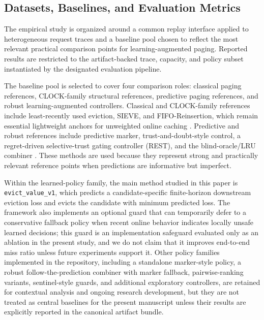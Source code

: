 \documentclass[preprint,12pt]{elsarticle}
\begin{document}
\subsection{Datasets, Baselines, and Evaluation Metrics}
\label{subsec:datasets-baselines-metrics}

The empirical study is organized around a common replay interface applied to heterogeneous request traces and a baseline pool chosen to reflect the most relevant practical comparison points for learning-augmented paging. Reported results are restricted to the artifact-backed trace, capacity, and policy subset instantiated by the designated evaluation pipeline.

The baseline pool is selected to cover four comparison roles: classical paging references, CLOCK-family structural references, predictive paging references, and robust learning-augmented controllers. Classical and CLOCK-family references include least-recently used eviction, SIEVE, and FIFO-Reinsertion, which remain essential lightweight anchors for unweighted online caching \cite{belady1966replacement_algorithms,fiat1991competitive_paging,zhang2024sieve}. Predictive and robust references include predictive marker, trust-and-doubt-style control, a regret-driven selective-trust gating controller (REST), and the blind-oracle/LRU combiner \cite{lykouris2021competitive_caching,antoniadis2020online_metric_untrusted,wei2020better_simpler_lac,chledowski2021robust_lac_experimental,im2022parsimonious_lac,rohatgi2020near_optimal_caching}. These methods are used because they represent strong and practically relevant reference points when predictions are informative but imperfect.

Within the learned-policy family, the main method studied in this paper is \texttt{evict\_value\_v1}, which predicts a candidate-specific finite-horizon downstream eviction loss and evicts the candidate with minimum predicted loss. The framework also implements an optional guard that can temporarily defer to a conservative fallback policy when recent online behavior indicates locally unsafe learned decisions; this guard is an implementation safeguard evaluated only as an ablation in the present study, and we do not claim that it improves end-to-end miss ratio unless future experiments support it. Other policy families implemented in the repository, including a standalone marker-style policy, a robust follow-the-prediction combiner with marker fallback, pairwise-ranking variants, sentinel-style guards, and additional exploratory controllers, are retained for contextual analysis and ongoing research development, but they are not treated as central baselines for the present manuscript unless their results are explicitly reported in the canonical artifact bundle.
\end{document}
